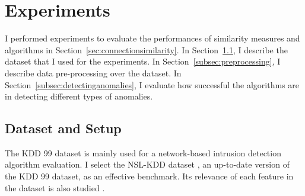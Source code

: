 \section{Experiments}
I performed experiments to evaluate the performances of similarity measures and algorithms in Section~\ref{sec:connectionsimilarity}.
\newline
In Section~\ref{subsec:datasetandsetup}, I describe the dataset that I used for the experiments.\newline
In Section~\ref{subsec:preprocessing}, I describe data pre-processing over the dataset.\newline
In Section~\ref{subsec:detectinganomalies}, I evaluate how successful the algorithms are in detecting different types of anomalies.

\subsection{Dataset and Setup}
\label{subsec:datasetandsetup}
The KDD 99 dataset is mainly used for a network-based intrusion detection algorithm evaluation. 
I select the NSL-KDD dataset \cite{tavallaee09}, an up-to-date version of the KDD 99 dataset, as an effective benchmark. 
Its relevance of each feature in the dataset is also studied \cite{olusola10} \cite{kayacik05}. 

